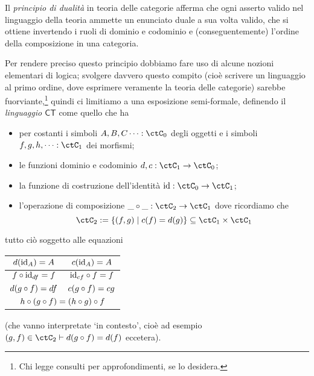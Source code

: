 \begin{proposition}
	Il \emph{principio di dualità} in teoria delle categorie afferma che ogni asserto valido nel linguaggio della teoria ammette un enunciato duale a sua volta valido, che si ottiene invertendo i ruoli di dominio e codominio e (conseguentemente) l'ordine della composizione in una categoria.

	Per rendere preciso questo principio dobbiamo fare uso di alcune nozioni elementari di logica; svolgere davvero questo compito (cioè scrivere un linguaggio al primo ordine, dove esprimere veramente la teoria delle categorie) sarebbe fuorviante,\footnote{Chi legge consulti \cite{ETCC} per approfondimenti, se lo desidera.} quindi ci limitiamo a una esposizione semi-formale, definendo il \emph{linguaggio \(\mathsf{CT}\)} come quello che ha
	\begin{itemize}
		\item per costanti i simboli \(A,B,C\dots : \ctC_0\) degli oggetti e i simboli \(f,g,h,\dots : \ctC_1\) dei morfismi;
		\item le funzioni dominio e codominio \(d,c : \ctC_1\to\ctC_0\);
		\item la funzione di costruzione dell'identità \(\id : \ctC_0\to \ctC_1\);
		\item l'operazione di composizione \(\_\cmp\_ : \ctC_2 \to \ctC_1\) dove ricordiamo che
		      \[\ctC_2 := \{(f,g)\mid c(f) = d(g)\}\subseteq\ctC_1\times\ctC_1\]
	\end{itemize}
	tutto ciò soggetto alle equazioni
		\begin{center}
			\begin{tabular}{cc}
			$d(\mathrm{id}_A)=A$                      & $c(\mathrm{id}_A)=A$       \\\midrule
			$f\circ \mathrm{id}_{df}=f$                & $\mathrm{id}_{cf}\circ f=f$ \\\midrule
			$d(g\circ f)=df$                   & $c(g\circ f)=cg$    \\\midrule
			\multicolumn{2}{c}{$h\circ (g\circ f)=(h\circ g)\circ f$}
			\end{tabular}
		\end{center}
	(che vanno interpretate `in contesto', cioè ad esempio \((g,f) \in \ctC_2\vdash d(g\cmp f)=d(f)\) eccetera).


\end{proposition}
